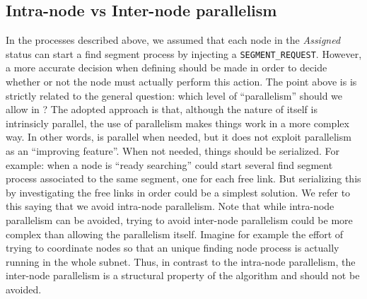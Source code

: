 \subsection{Intra-node vs Inter-node parallelism}
In the processes described above, we assumed that each node in the
\emph{Assigned} status can start a find segment process by injecting a
\texttt{SEGMENT\_REQUEST}. However, a more accurate decision when
defining \disr{} should be made in order to decide whether or not the
node must actually perform this action.  The point above is is
strictly related to the general question: which level of “parallelism”
should we allow in \disr{} ? The adopted approach is that, although
the nature of \disr{} itself is intrinsicly parallel, the use of
parallelism makes things work in a more complex way. In other words,
\disr{} is parallel when needed, but it does not exploit parallelism
as an “improving feature”. When not needed, things should be
serialized. For example: when a node is “ready searching” could start
several find segment process associated to the same segment, one for
each free link. But serializing this by investigating the free links
in order could be a simplest solution. We refer to this saying that we
avoid intra-node parallelism.  Note that while intra-node parallelism
can be avoided, trying to avoid inter-node parallelism could be more
complex than allowing the parallelism itself. Imagine for example the
effort of trying to coordinate nodes so that an unique finding node
process is actually running in the whole subnet. Thus, in contrast to
the intra-node parallelism, the inter-node parallelism is a structural
property of the \disr{} algorithm and should not be avoided.
